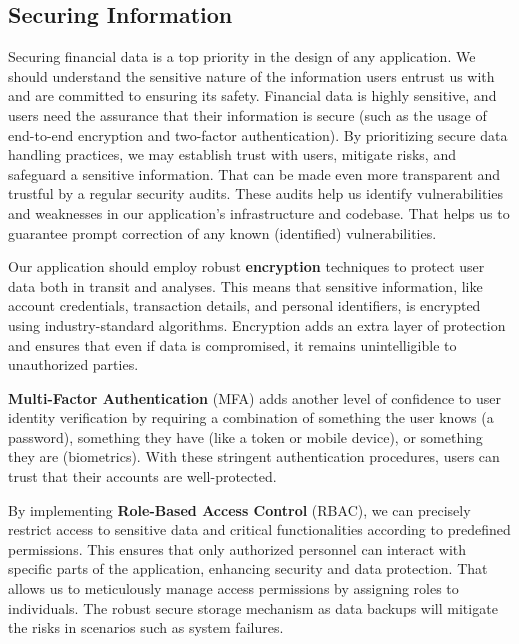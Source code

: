 \subsection{Securing Information}

Securing financial data is a top priority in the design of any application. We should understand the sensitive nature 
of the information users entrust us with and are committed to ensuring its safety. Financial data is highly sensitive, 
and users need the assurance that their information is secure (such as the usage of end-to-end encryption and 
two-factor authentication). By prioritizing secure data handling practices, we may establish trust with users, mitigate 
risks, and safeguard a sensitive information. That can be made even more transparent and trustful by a regular security 
audits. These audits help us identify vulnerabilities and weaknesses in our application's infrastructure and codebase. 
That helps us to guarantee prompt correction of any known (identified) vulnerabilities.

Our application should employ robust \textbf{encryption} techniques to protect user data both in transit and analyses. 
This means that sensitive information, like account credentials, transaction details, and personal identifiers, is 
encrypted using industry-standard algorithms. Encryption adds an extra layer of protection and ensures that even if 
data is compromised, it remains unintelligible to unauthorized parties.

\textbf{Multi-Factor Authentication} (MFA) adds another level of confidence to user identity verification by requiring
a combination of something the user knows (a password), something they have (like a token or mobile device), or 
something they are (biometrics). With these stringent authentication procedures, users can trust that their accounts 
are well-protected. 

By implementing \textbf{Role-Based Access Control} (RBAC), we can precisely restrict access to sensitive data and critical 
functionalities according to predefined permissions. This ensures that only authorized personnel can interact with 
specific parts of the application, enhancing security and data protection. That allows us to meticulously manage access 
permissions by assigning roles to individuals. The robust secure storage mechanism as data backups will mitigate the 
risks in scenarios such as system failures.

